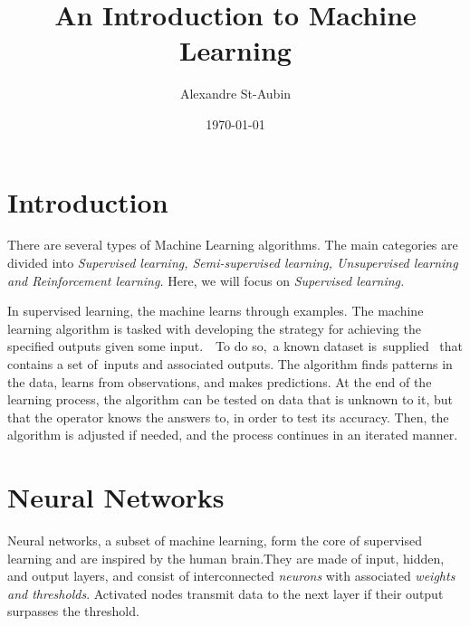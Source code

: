 \documentclass{tufte-handout}
\title{An Introduction to Machine Learning}
\date{\today}
\author{Alexandre St-Aubin}
\makeatletter
\renewcommand{\maketitlepage}{%
\begingroup%
\setlength{\parindent}{0pt}

{\fontsize{24}{24}\selectfont\textit{\@author}\par}

\vspace{1.75in}{\fontsize{36}{54}\selectfont\@title\par}

\vspace{0.5in}{\fontsize{14}{14}\selectfont\textsf{\smallcaps{\@date}}\par}

\vspace{0.5in}\usebox{\titleimage}

\vfill{\fontsize{14}{14}\selectfont\textit{\@publisher}\par}

\thispagestyle{empty}
\endgroup
\newpage
}
\makeatother
\begin{document}
\maketitlepage%

\tableofcontents
\newpage

\section{Introduction}
There are several types of Machine Learning algorithms. The main categories are divided into \textit{Supervised learning, Semi-supervised learning, Unsupervised learning and Reinforcement learning.} Here, we will focus on \textit{Supervised learning.}




\begin{definition}
  In supervised learning, the machine learns through examples. The machine learning algorithm is tasked with developing the strategy for achieving the specified outputs given some input.  To do so, a known dataset is supplied  that contains a set of inputs and associated outputs. The algorithm finds patterns in the data, learns from observations, and makes predictions. At the end of the learning process, the algorithm can be tested on data that is unknown to it, but that the operator knows the answers to, in order to test its accuracy. Then, the algorithm is adjusted if needed, and the process continues in an iterated manner.
\end{definition}


\section{Neural Networks}
Neural networks, a subset of machine learning, form the core of supervised learning and are inspired by the human brain\cite{web:IBM:NN}.They are made of input, hidden, and output layers, and consist of interconnected \textit{neurons} with associated \textit{weights and thresholds}. Activated nodes transmit data to the next layer if their output surpasses the threshold. 
\end{document}
